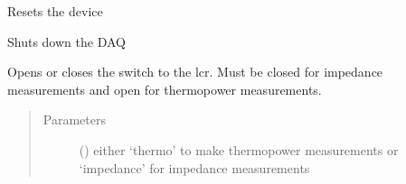 \documentclass[letterpaper,10pt,english]{sphinxmanual}
\begin{document}
\begin{fulllineitems}
\begin{fulllineitems}
\label{\detokenize{drivers:drivers.DAQ.reset}}
Resets the device

\end{fulllineitems}


\begin{fulllineitems}
\label{\detokenize{drivers:drivers.DAQ.shutdown}}
Shuts down the DAQ

\end{fulllineitems}


\begin{fulllineitems}
\label{\detokenize{drivers:drivers.DAQ.toggle_switch}}
Opens or closes the switch to the lcr. Must be closed for impedance measurements and open for thermopower measurements.
\begin{quote}\begin{description}
\item[{Parameters}] \leavevmode
{} () \textendash{} either ‘thermo’ to make thermopower measurements or ‘impedance’ for impedance measurements

\end{description}\end{quote}

\end{fulllineitems}


\end{fulllineitems}

\end{document}
